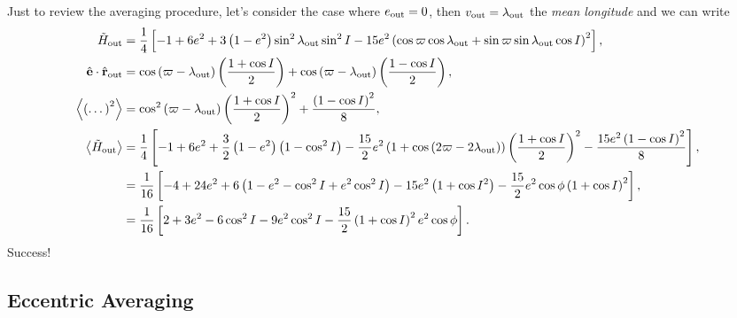 \documentclass[10pt,
        usenames, %
        dvipsnames %
    ]{article}
\newcommand*{\bm}[1]{\boldsymbol{\mathbf{#1}}}
\newcommand*{\uv}[1]{\hat{\bm{#1}}}
\newcommand*{\ev}[1]{\left\langle#1\right\rangle}
\newcommand*{\p}[1]{\left(#1\right)}
\newcommand*{\s}[1]{\left[#1\right]}
\begin{document}
Just to review the averaging procedure, let's consider the case where $e_{\rm
out} = 0$, then $v_{\rm out} = \lambda_{\rm out}$ the \emph{mean longitude} and
we can write
\begin{align}
    \tilde{H}_{\rm out} &= \frac{1}{4}\s{
        -1 + 6e^2 + 3\p{1 - e^2}\sin^2 \lambda_{\rm out} \sin^2 I
        - 15e^2\p{\cos \varpi \cos \lambda_{\rm out}
            + \sin \varpi \sin \lambda_{\rm out}\cos I}^2},\\
    \uv{e} \cdot \uv{r}_{\rm out} &=
        \cos\p{\varpi - \lambda_{\rm out}}\p{\frac{1 + \cos I}{2}}
            + \cos\p{\varpi - \lambda_{\rm out}}\p{\frac{1 - \cos I}{2}},\\
    \ev{\p{\dots}^2} &=
        \cos^2\p{\varpi - \lambda_{\rm out}}\p{\frac{1 + \cos I}{2}}^2
            + \frac{\p{1 - \cos I}^2}{8},\\
    \ev{\tilde{H}_{\rm out}} &= \frac{1}{4}\s{
        -1 + 6e^2 + \frac{3}{2}\p{1 - e^2}\p{1 - \cos^2 I}
            - \frac{15}{2} e^2 \p{1 + \cos\p{2\varpi - 2\lambda_{\rm out}}}
                \p{\frac{1 + \cos I}{2}}^2
                - \frac{15e^2\p{1 - \cos I}^2}{8}},\\
        &= \frac{1}{16}\s{-4 + 24 e^2 + 6\p{1 - e^2 - \cos^2 I
            + e^2\cos^2 I} - 15e^2\p{1 + \cos I^2} - \frac{15}{2}
                e^2\cos \phi\p{1 + \cos I}^2},\\
        &= \frac{1}{16}\s{2 + 3e^2 - 6\cos^2 I - 9e^2\cos^2 I
            - \frac{15}{2}\p{1 + \cos I}^2 e^2 \cos \phi}.
\end{align}
Success!

\subsection{Eccentric Averaging}
\end{document}
